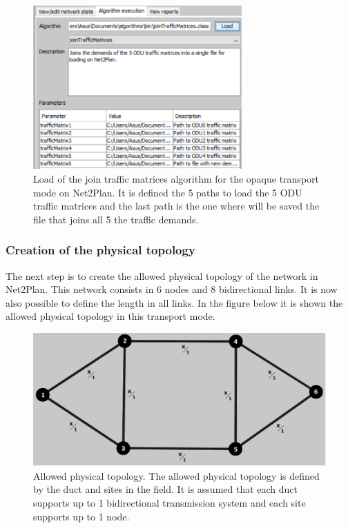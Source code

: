 \begin{figure}[H]
\centering
\includegraphics[width=8cm]{sdf/heuristic/opaque_survivability/figures/traffic_matrices}
\caption{Load of the join traffic matrices algorithm for the opaque transport mode on Net2Plan. It is defined the 5 paths to load the 5 ODU traffic matrices and the last path is the one where will be saved the file that joins all 5 the traffic demands.}
\label{traffic_matrices_surv_ref_opaque}
\end{figure}

\newpage
\subsubsection{Creation of the physical topology}

\vspace{11pt}
The next step is to create the allowed physical topology of the network in Net2Plan. This network consists in 6 nodes and 8 bidirectional links. It is now also possible to define the length in all links. In the figure below it is shown the allowed physical topology in this transport mode.

\begin{figure}[H]
\centering
\includegraphics[width=12cm]{sdf/heuristic/opaque_survivability/figures/allowed_physical}
\caption{Allowed physical topology. The allowed physical topology is defined by the duct and sites in the field. It is assumed that each duct supports up to 1 bidirectional transmission system and each site supports up to 1 node.}
\label{allowed_physical_surv_opaque}
\end{figure}

